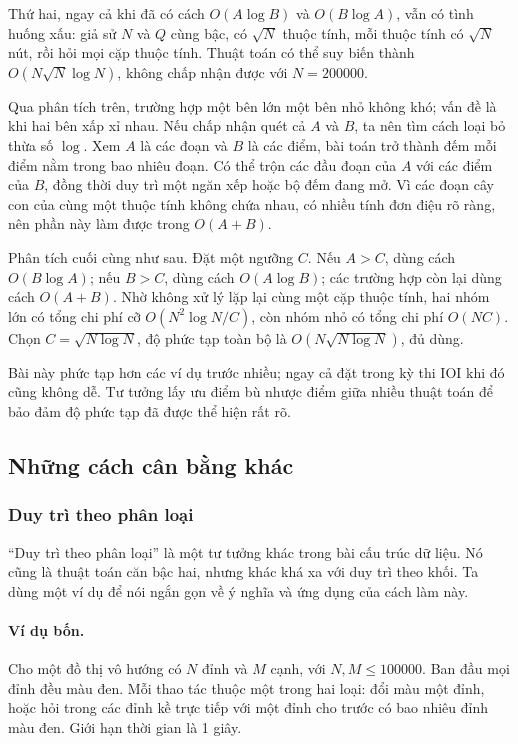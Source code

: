 \documentclass[11pt]{article}
\begin{document}
Thứ hai, ngay cả khi đã có cách \(O(A\log B)\) và \(O(B\log A)\), vẫn có tình
huống xấu: giả sử \(N\) và \(Q\) cùng bậc, có \(\sqrt N\) thuộc tính, mỗi thuộc
tính có \(\sqrt N\) nút, rồi hỏi mọi cặp thuộc tính. Thuật toán có thể suy biến
thành \(O(N\sqrt N\log N)\), không chấp nhận được với \(N=200000\).

Qua phân tích trên, trường hợp một bên lớn một bên nhỏ không khó; vấn đề là
khi hai bên xấp xỉ nhau. Nếu chấp nhận quét cả \(A\) và \(B\), ta nên tìm cách
loại bỏ thừa số \(\log\). Xem \(A\) là các đoạn và \(B\) là các điểm, bài toán
trở thành đếm mỗi điểm nằm trong bao nhiêu đoạn. Có thể trộn các đầu đoạn của
\(A\) với các điểm của \(B\), đồng thời duy trì một ngăn xếp hoặc bộ đếm đang
mở. Vì các đoạn cây con của cùng một thuộc tính không chứa nhau, có nhiều tính
đơn điệu rõ ràng, nên phần này làm được trong \(O(A+B)\).

Phân tích cuối cùng như sau. Đặt một ngưỡng \(C\). Nếu \(A>C\), dùng cách
\(O(B\log A)\); nếu \(B>C\), dùng cách \(O(A\log B)\); các trường hợp còn lại
dùng cách \(O(A+B)\). Nhờ không xử lý lặp lại cùng một cặp thuộc tính, hai
nhóm lớn có tổng chi phí cỡ \(O(N^2\log N/C)\), còn nhóm nhỏ có tổng chi phí
\(O(NC)\). Chọn \(C=\sqrt{N\log N}\), độ phức tạp toàn bộ là
\(O(N\sqrt{N\log N})\), đủ dùng.

Bài này phức tạp hơn các ví dụ trước nhiều; ngay cả đặt trong kỳ thi IOI khi
đó cũng không dễ. Tư tưởng lấy ưu điểm bù nhược điểm giữa nhiều thuật toán để
bảo đảm độ phức tạp đã được thể hiện rất rõ.

\subsection{Những cách cân bằng khác}

\subsubsection{Duy trì theo phân loại}

``Duy trì theo phân loại'' là một tư tưởng khác trong bài cấu trúc dữ liệu. Nó
cũng là thuật toán căn bậc hai, nhưng khác khá xa với duy trì theo khối. Ta
dùng một ví dụ để nói ngắn gọn về ý nghĩa và ứng dụng của cách làm này.

\paragraph{Ví dụ bốn.}
Cho một đồ thị vô hướng có \(N\) đỉnh và \(M\) cạnh, với
\(N,M\le 100000\). Ban đầu mọi đỉnh đều màu đen. Mỗi thao tác thuộc một trong
hai loại: đổi màu một đỉnh, hoặc hỏi trong các đỉnh kề trực tiếp với một đỉnh
cho trước có bao nhiêu đỉnh màu đen. Giới hạn thời gian là 1 giây.
\end{document}
